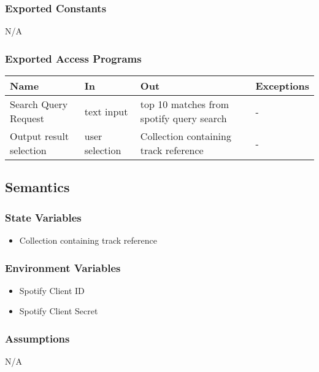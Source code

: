 \documentclass[12pt, titlepage]{article}
\begin{document}
\subsubsection{Exported Constants}
N/A

\subsubsection{Exported Access Programs}

\begin{center}
\begin{tabular}{p{2cm} p{4cm} p{4cm} p{2cm}}
\hline
\textbf{Name} & \textbf{In} & \textbf{Out} & \textbf{Exceptions}\\
\hline%
Search Query Request &text input &top 10 matches from spotify query search &-\\
Output result selection &user selection &Collection containing track reference &-\\
\hline
\end{tabular}
\end{center}

\subsection{Semantics}

\subsubsection{State Variables}
\begin{itemize}
  \item Collection containing track reference
\end{itemize}

\subsubsection{Environment Variables}
\begin{itemize}
  \item Spotify Client ID
  \item Spotify Client Secret
\end{itemize}

\subsubsection{Assumptions}
N/A
\end{document}
